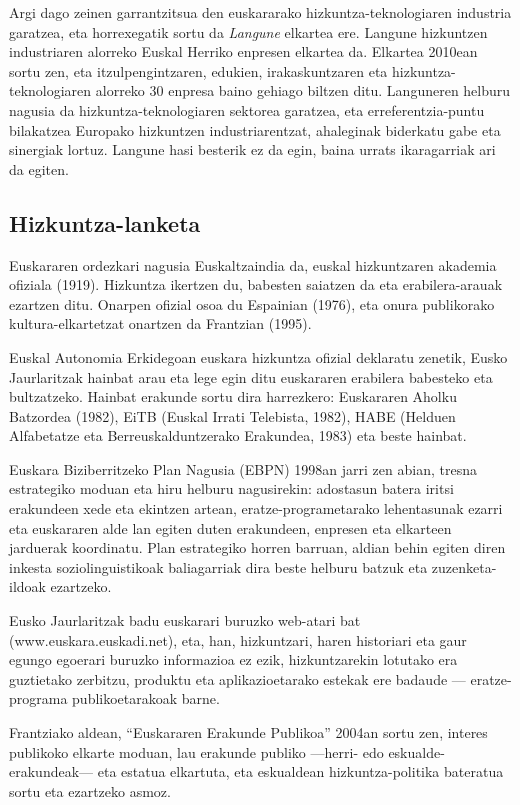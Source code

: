 \begin{multicols}{2}
Argi dago zeinen garrantzitsua den euskararako hizkuntza-teknologiaren industria garatzea, eta horrexegatik sortu da \textit{Langune} \cite{BAS-Nota10}  elkartea ere. Langune hizkuntzen industriaren alorreko Euskal Herriko enpresen elkartea da. Elkartea 2010ean sortu zen, eta itzulpengintzaren, edukien, irakaskuntzaren eta hizkuntza-teknologiaren alorreko 30 enpresa baino gehiago biltzen ditu. Languneren helburu nagusia da hizkuntza-teknologiaren sektorea garatzea, eta erreferentzia-puntu bilakatzea Europako hizkuntzen industriarentzat, ahaleginak biderkatu gabe eta sinergiak lortuz. Langune hasi besterik ez da egin, baina urrats ikaragarriak ari da egiten.

\subsection{Hizkuntza-lanketa}
    Euskararen ordezkari nagusia Euskaltzaindia da, euskal hizkuntzaren akademia ofiziala (1919). Hizkuntza ikertzen du, babesten saiatzen da eta erabilera-arauak ezartzen ditu. Onarpen ofizial osoa du Espainian (1976), eta onura publikorako kultura-elkartetzat onartzen da Frantzian (1995). 

Euskal Autonomia Erkidegoan euskara hizkuntza ofizial deklaratu zenetik, Eusko Jaurlaritzak hainbat arau eta lege egin ditu euskararen erabilera babesteko eta bultzatzeko. Hainbat erakunde sortu dira harrezkero: Euskararen Aholku Batzordea (1982), EiTB (Euskal Irrati Telebista, 1982), HABE (Helduen Alfabetatze eta Berreuskalduntzerako Erakundea, 1983) eta beste hainbat. 

Euskara Biziberritzeko Plan Nagusia (EBPN) 1998an jarri zen abian, tresna estrategiko moduan eta hiru helburu nagusirekin: adostasun batera iritsi erakundeen xede eta ekintzen artean, eratze-programetarako lehentasunak ezarri eta euskararen alde lan egiten duten erakundeen, enpresen eta elkarteen jarduerak koordinatu. Plan estrategiko horren barruan, aldian behin egiten diren inkesta soziolinguistikoak baliagarriak dira beste helburu batzuk eta zuzenketa-ildoak ezartzeko. 

Eusko Jaurlaritzak badu euskarari buruzko web-atari bat (www.euskara.euskadi.net), eta, han, hizkuntzari, haren historiari eta gaur egungo egoerari buruzko informazioa ez ezik, hizkuntzarekin lotutako era guztietako zerbitzu, produktu eta aplikazioetarako estekak ere badaude — eratze-programa publikoetarakoak barne. 

Frantziako aldean, “Euskararen Erakunde Publikoa” \cite{BAS-Nota11}  2004an sortu zen, interes publikoko elkarte moduan, lau erakunde publiko —herri- edo eskualde-erakundeak— eta estatua elkartuta, eta eskualdean hizkuntza-politika bateratua sortu eta ezartzeko asmoz.


\end{multicols}
